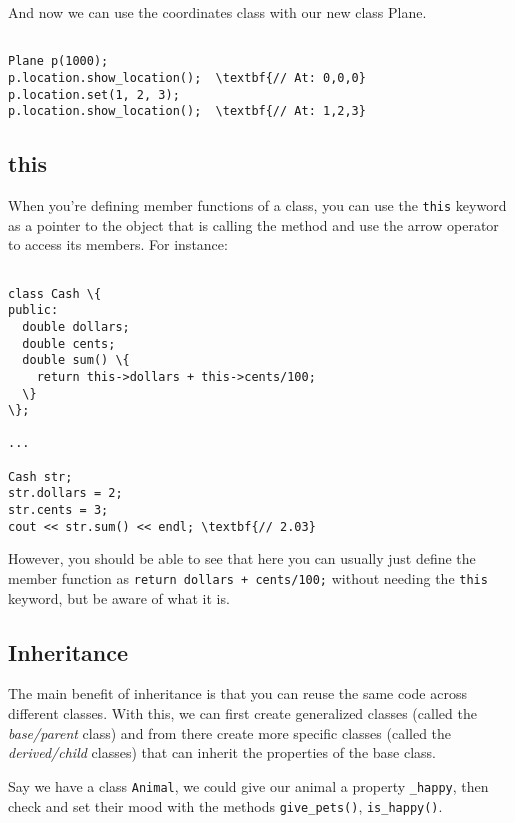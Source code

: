 \documentclass{IEEEtran}
\begin{document}
And now we can use the coordinates class with our new class Plane.

\begin{Verbatim}[fontsize=\scriptsize, xleftmargin=.3in, commandchars=\\\{\}]

Plane p(1000);
p.location.show_location();  \textbf{// At: 0,0,0}
p.location.set(1, 2, 3);
p.location.show_location();  \textbf{// At: 1,2,3}

\end{Verbatim}
  

\subsection{this}

When you're defining member functions of a class, you can use the \verb|this| keyword as a pointer to the object that is calling the method and use the arrow operator to access its members. For instance:

\begin{Verbatim}[fontsize=\scriptsize, xleftmargin=.3in, commandchars=\\\{\}]

class Cash \{
public:
  double dollars;
  double cents;
  double sum() \{
    return this->dollars + this->cents/100;
  \}
\};

...

Cash str;
str.dollars = 2;
str.cents = 3;
cout << str.sum() << endl; \textbf{// 2.03}

\end{Verbatim}

However, you should be able to see that here you can usually just define the member function as \verb|return dollars + cents/100;| without needing the \verb|this| keyword, but be aware of what it is. 



\subsection{Inheritance}

The main benefit of inheritance is that you can reuse the same code across different classes. With this, we can first create generalized classes (called the \textit{base/parent} class) and from there create more specific classes (called the \textit{derived/child} classes) that can inherit the properties of the base class.

Say we have a  class \verb|Animal|, we could give our animal a property \verb|_happy|, then check and set their mood with the methods \verb|give_pets()|, \verb|is_happy()|.
\end{document}
